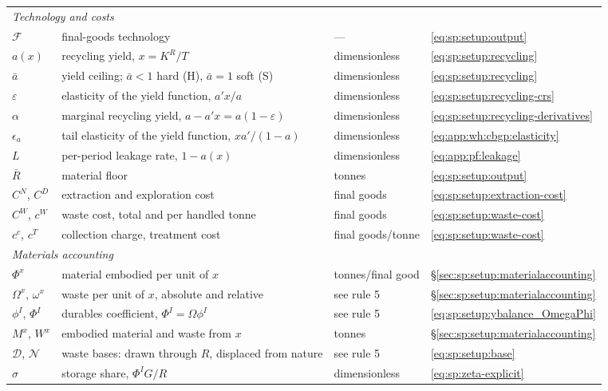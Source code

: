 \begin{center}
\begin{tabular}{llll}
\multicolumn{4}{l}{\textit{Technology and costs}}\\
$\mathcal F$ & final-goods technology & --- & \eqref{eq:sp:setup:output}\\
$a(x)$ & recycling yield, $x=K^R/T$ & dimensionless & \eqref{eq:sp:setup:recycling}\\
$\bar a$ & yield ceiling; $\bar a<1$ hard (H), $\bar a=1$ soft (S) & dimensionless & \eqref{eq:sp:setup:recycling}\\
$\varepsilon$ & elasticity of the yield function, $a'x/a$ & dimensionless & \eqref{eq:sp:setup:recycling-crs}\\
$\alpha$ & marginal recycling yield, $a-a'x=a(1-\varepsilon)$ & dimensionless & \eqref{eq:sp:setup:recycling-derivatives}\\
$\epsilon_a$ & tail elasticity of the yield function, $xa'/(1-a)$ & dimensionless & \eqref{eq:app:wh:cbgp:elasticity}\\
$L$ & per-period leakage rate, $1-a(x)$ & dimensionless & \eqref{eq:app:pf:leakage}\\
$\bar R$ & material floor & tonnes & \eqref{eq:sp:setup:output}\\
$C^N$, $C^D$ & extraction and exploration cost & final goods & \eqref{eq:sp:setup:extraction-cost}\\
$C^W$, $c^W$ & waste cost, total and per handled tonne & final goods & \eqref{eq:sp:setup:waste-cost}\\
$c^c$, $c^T$ & collection charge, treatment cost & final goods/tonne & \eqref{eq:sp:setup:waste-cost}\\
\multicolumn{4}{l}{\textit{Materials accounting}}\\
$\Phi^x$ & material embodied per unit of $x$ & tonnes/final good & \S\ref{sec:sp:setup:materialaccounting}\\
$\Omega^x$, $\omega^x$ & waste per unit of $x$, absolute and relative & see rule 5 & \S\ref{sec:sp:setup:materialaccounting}\\
$\phi^I$, $\Phi^I$ & durables coefficient, $\Phi^I=\Omega\phi^I$ & see rule 5 & \eqref{eq:sp:setup:ybalance_OmegaPhi}\\
$M^x$, $W^x$ & embodied material and waste from $x$ & tonnes & \S\ref{sec:sp:setup:materialaccounting}\\
$\mathcal D$, $\mathcal N$ & waste bases: drawn through $R$, displaced from nature & see rule 5 & \eqref{eq:sp:setup:base}\\
$\sigma$ & storage share, $\Phi^IG/R$ & dimensionless & \eqref{eq:sp:zeta-explicit}\\

\end{tabular}
\end{center}
